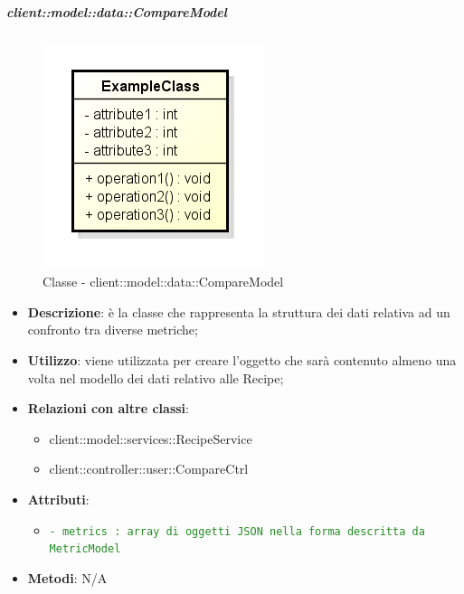 		\subparagraph{client::model::data::CompareModel} %
		\label{subp:client_model_data_comparemodel}
			\begin{figure}[htbp]
				\centering
				\centerline{\includegraphics[scale=0.7]{./images/client/classes/example_class.png}}
				\caption{Classe - client::model::data::CompareModel}
			\end{figure}
			\begin{itemize}
				\item \textbf{Descrizione}: è la classe che rappresenta la struttura dei dati relativa ad un confronto tra diverse metriche;
				\item \textbf{Utilizzo}: viene utilizzata per creare l'oggetto che sarà contenuto almeno una volta nel modello dei dati relativo alle Recipe;
				\item \textbf{Relazioni con altre classi}:
					\begin{itemize}
						\item client::model::services::RecipeService
						\item client::controller::user::CompareCtrl
					\end{itemize}
				\item \textbf{Attributi}:
					\begin{itemize}
						\item \textcolor{forestgreen}{\texttt{- metrics : array di oggetti JSON nella forma descritta da MetricModel}}
					\end{itemize}
				\item \textbf{Metodi}: N/A
			\end{itemize}

